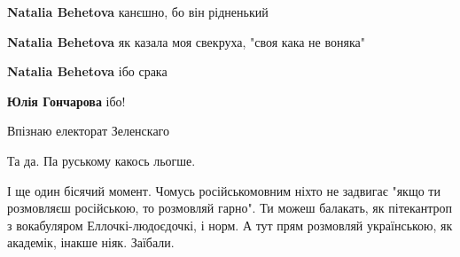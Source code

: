 \begin{itemize}
{\begin{itemize}
{\textbf{Natalia Behetova} канєшно, бо він рідненький

 
\textbf{Natalia Behetova} як казала моя свекруха, "своя кака не воняка"

 
\textbf{Natalia Behetova} ібо срака

 
\textbf{Юлія Гончарова} ібо!
}\end{itemize}

 
Впізнаю електорат Зеленскаго


Та да. Па руському какось льогше.

І ще один бісячий момент. Чомусь російськомовним ніхто не задвигає "якщо ти
розмовляєш російською, то розмовляй гарно". Ти можеш балакать, як пітекантроп з
вокабуляром Еллочкі-людоєдочкі, і норм. А тут прям розмовляй українською, як
академік, інакше ніяк. Заїбали.

\begin{itemize}{
 
}
\end{itemize}}
\end{itemize}
